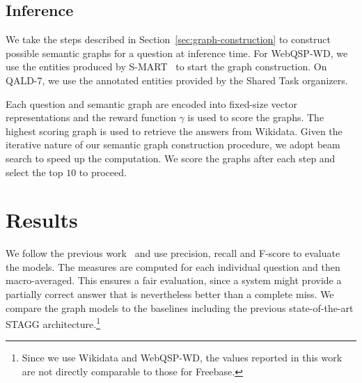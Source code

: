 \documentclass[11pt]{article}
\begin{document}
\subsection{Inference}
\label{sec:inference}

We take the steps described in Section~\ref{sec:graph-construction} to construct possible semantic graphs for a question at inference time. For WebQSP-WD, we use the entities produced by S-MART~\cite{Yang2015a} to start the graph construction. On QALD-7, we use the annotated entities provided by the Shared Task organizers.

Each question and semantic graph are encoded into fixed-size vector representations and the reward function $\gamma$ is used to score the graphs. The highest scoring graph is used to retrieve the answers from Wikidata. Given the iterative nature of our semantic graph construction procedure, we adopt beam search to speed up the computation. We score the graphs after each step and select the top $10$ to proceed.

\section{Results}
\label{sec:results}

We follow the previous work~\cite{Berant2013} and use precision, recall and F-score to evaluate the models. The measures are computed for each individual question and then macro-averaged. This ensures a fair evaluation, since a system might provide a partially correct answer that is nevertheless better than a complete miss. We compare the graph models to the baselines including the previous state-of-the-art STAGG architecture.\footnote{Since we use Wikidata and WebQSP-WD, the values reported in this work are not directly comparable to those for Freebase.}
\end{document}
